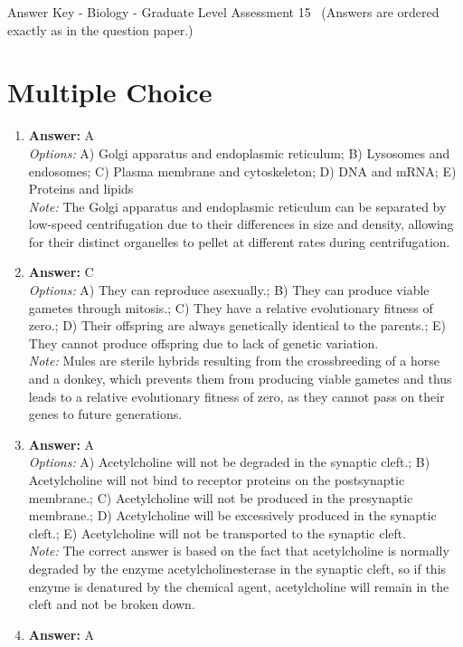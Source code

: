 \documentclass[12pt]{article}
\begin{document}
\begin{center}
Answer Key - Biology - Graduate Level Assessment 15 \
\small (Answers are ordered exactly as in the question paper.)
\end{center}

\section*{Multiple Choice}
\begin{enumerate}[label=\arabic*.]
\item \textbf{Answer:} A
\\ \textit{Options:} A) Golgi apparatus and endoplasmic reticulum; B) Lysosomes and endosomes; C) Plasma membrane and cytoskeleton; D) DNA and mRNA; E) Proteins and lipids
\\ \textit{Note:} The Golgi apparatus and endoplasmic reticulum can be separated by low-speed centrifugation due to their differences in size and density, allowing for their distinct organelles to pellet at different rates during centrifugation.
\item \textbf{Answer:} C
\\ \textit{Options:} A) They can reproduce asexually.; B) They can produce viable gametes through mitosis.; C) They have a relative evolutionary fitness of zero.; D) Their offspring are always genetically identical to the parents.; E) They cannot produce offspring due to lack of genetic variation.
\\ \textit{Note:} Mules are sterile hybrids resulting from the crossbreeding of a horse and a donkey, which prevents them from producing viable gametes and thus leads to a relative evolutionary fitness of zero, as they cannot pass on their genes to future generations.
\item \textbf{Answer:} A
\\ \textit{Options:} A) Acetylcholine will not be degraded in the synaptic cleft.; B) Acetylcholine will not bind to receptor proteins on the postsynaptic membrane.; C) Acetylcholine will not be produced in the presynaptic membrane.; D) Acetylcholine will be excessively produced in the synaptic cleft.; E) Acetylcholine will not be transported to the synaptic cleft.
\\ \textit{Note:} The correct answer is based on the fact that acetylcholine is normally degraded by the enzyme acetylcholinesterase in the synaptic cleft, so if this enzyme is denatured by the chemical agent, acetylcholine will remain in the cleft and not be broken down.
\item \textbf{Answer:} A

\end{enumerate}
\end{document}

